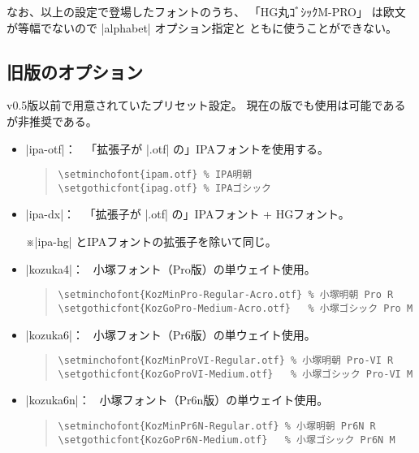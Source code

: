 \documentclass[a4paper,uplatex]{jsarticle}
\newcommand{\Note}{\par\noindent ※}
\newcommand{\Means}{：\ }
\begin{document}
なお、以上の設定で登場したフォントのうち、
「HG丸ｺﾞｼｯｸM-PRO」
は欧文が等幅でないので |alphabet| オプション指定と
ともに使うことができない。

\subsection{旧版のオプション}

v0.5版以前で用意されていたプリセット設定。
現在の版でも使用は可能であるが非推奨である。

\begin{itemize}
\item |ipa-otf|\Means
  「拡張子が |.otf| の」IPAフォントを使用する。
\begin{quote}\small\begin{verbatim}
\setminchofont{ipam.otf} % IPA明朝
\setgothicfont{ipag.otf} % IPAゴシック
\end{verbatim}\end{quote}

\item |ipa-dx|\Means
  「拡張子が |.otf| の」IPAフォント + HGフォント。
  \Note |ipa-hg| とIPAフォントの拡張子を除いて同じ。

\item |kozuka4|\Means
  小塚フォント（Pro版）の単ウェイト使用。
\begin{quote}\small\begin{verbatim}
\setminchofont{KozMinPro-Regular-Acro.otf} % 小塚明朝 Pro R
\setgothicfont{KozGoPro-Medium-Acro.otf}   % 小塚ゴシック Pro M
\end{verbatim}\end{quote}

\item |kozuka6|\Means
  小塚フォント（Pr6版）の単ウェイト使用。
\begin{quote}\small\begin{verbatim}
\setminchofont{KozMinProVI-Regular.otf} % 小塚明朝 Pro-VI R
\setgothicfont{KozGoProVI-Medium.otf}   % 小塚ゴシック Pro-VI M
\end{verbatim}\end{quote}

\item |kozuka6n|\Means
  小塚フォント（Pr6n版）の単ウェイト使用。
\begin{quote}\small\begin{verbatim}
\setminchofont{KozMinPr6N-Regular.otf} % 小塚明朝 Pr6N R
\setgothicfont{KozGoPr6N-Medium.otf}   % 小塚ゴシック Pr6N M
\end{verbatim}\end{quote}


\end{itemize}
\end{document}
